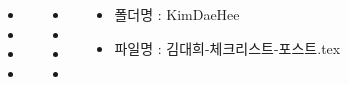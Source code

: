 \documentclass[	20pt, 
							a1paper, 
							portrait, %
							margin=0mm, %
							innermargin=10mm,  		%
							colspace=5mm, 
							subcolspace=0mm
							]{tikzposter}
\begin{document}
\begin{columns}
{\begin{LARGE}
\begin{itemize}
					\end{itemize}
				\end{LARGE}
			}



			{
				\begin{LARGE}
					\begin{itemize}
					\item 
					\item 
					\item 
					\item 
					\end{itemize}
				\end{LARGE}
			}


			{
				\begin{LARGE}
					\begin{itemize}
					\item 
					\item 
					\item 
					\item 
					\end{itemize}
				\end{LARGE}
			}




			{
				\begin{LARGE}
					\begin{itemize}
					\item 폴더명 : KimDaeHee
					\item 파일명 : 김대희-체크리스트-포스트.tex
					\end{itemize}
				\end{LARGE}
			}



	\end{columns}
\end{document}
